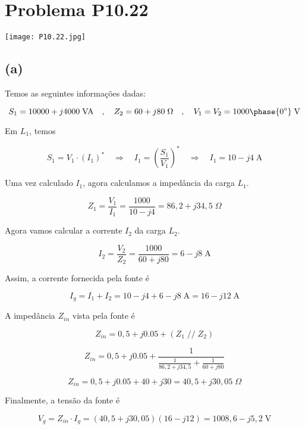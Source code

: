 
\section*{Problema P10.22}

\renewcommand*\thesection{10.22}

\begin{center}
    \texttt{[image: P10.22.jpg]}
\end{center}

\subsection*{(a)}

Temos as seguintes informações dadas:

\[ S_1 = 10000 + j4000 \;\textrm{VA} \quad , \quad Z_2 = 60 + j80 \;\Omega \quad , \quad V_1 = V_2 = 1000\phase{0^{\circ}} \;\textrm{V} \]

Em $L_1$, temos    

\[ S_1 = V_1 \cdot (I_1)^* \quad \Rightarrow \quad I_1 = \left(\frac{S_1}{V_1}\right)^* \quad \Rightarrow \quad I_1 = 10 -j4 \;\textrm{A}\]

Uma vez calculado $I_1$, agora calculamos a impedância da carga $L_1$.

\[ Z_1 = \frac{V_1}{I_1} = \frac{1000}{10 - j4} = 86,2 + j34,5 \;\Omega \]

Agora vamos calcular a corrente $I_2$ da carga $L_2$.

\[ I_2 = \frac{V_2}{Z_2} = \frac{1000}{60 + j80} = 6 - j8 \;\textrm{A}  \]



Assim, a corrente fornecida pela fonte é

\[ I_g = I_1 + I_2 = 10 -j4 +  6 - j8 \;\textrm{A} = 16 - j12 \;\textrm{A} \]

A impedância $Z_{in}$ vista pela fonte é

\[ Z_{in} = 0,5 + j0.05 + (Z_1 \; // \; Z_2) \]

\[ Z_{in} = 0,5 + j0.05 + \frac{1}{\frac{1}{86,2 + j34,5} + \frac{1}{60 + j80}} \]

\[ Z_{in} = 0,5 + j0.05 + 40 + j30 = 40,5 + j30,05 \;\Omega \]

Finalmente, a tensão da fonte é

\[ V_g = Z_{in} \cdot I_g = (40,5 + j30,05)(16 - j12) = 1008,6 - j5,2 \;\textrm{V}\]

